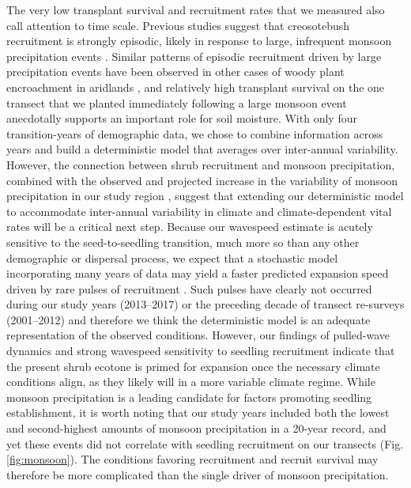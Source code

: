 \documentclass[11pt]{article}\usepackage[]{graphicx}\usepackage[usenames,dvipsnames]{xcolor}
\begin{document}
The very low transplant survival and recruitment rates that we measured also call attention to time scale. 
Previous studies suggest that creosotebush recruitment is strongly episodic, likely in response to large, infrequent monsoon precipitation events \citep{moreno2016seed,allen2008allometry,boyd1983postdispersal}.
Similar patterns of episodic recruitment driven by large precipitation events have been observed in other cases of woody plant encroachment in aridlands \citep{harrington1991effects,weber2022woody}, and relatively high transplant survival on the one transect that we planted immediately following a large monsoon event anecdotally supports an important role for soil moisture. 
With only four transition-years of demographic data, we chose to combine information across years and build a deterministic model that averages over inter-annual variability.
However, the connection between shrub recruitment and monsoon precipitation, combined with the observed and projected increase in the variability of monsoon precipitation in our study region \citep{petrie2014regional,rudgers2018climate}, suggest that extending our deterministic model to accommodate inter-annual variability in climate and climate-dependent vital rates will be a critical next step. 
Because our wavespeed estimate is acutely sensitive to the seed-to-seedling transition, much more so than any other demographic or dispersal process, we expect that a stochastic model incorporating many years of data may yield a faster predicted expansion speed driven by rare pulses of recruitment \citep{ellner2012temporally}. 
Such pulses have clearly not occurred during our study years (2013--2017) or the preceding decade of transect re-surveys (2001--2012) and therefore we think the deterministic model is an adequate representation of the observed conditions. 
However, our findings of pulled-wave dynamics and strong wavespeed sensitivity to seedling recruitment indicate that the present shrub ecotone is primed for expansion once the necessary climate conditions align, as they likely will in a more variable climate regime.
While monsoon precipitation is a leading candidate for factors promoting seedling establishment, it is worth noting that our study years included both the lowest and second-highest amounts of monsoon precipitation in a 20-year record, and yet these events did not correlate with seedling recruitment on our transects (Fig. \ref{fig:monsoon}). 
The conditions favoring recruitment and recruit survival may therefore be more complicated than the single driver of monsoon precipitation. 
\end{document}

